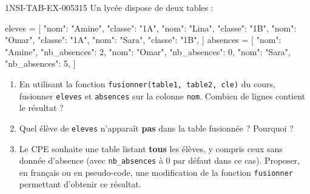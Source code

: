 \begin{exercice}{1NSI-TAB-EX-005}{3}{15}
Un lycée dispose de deux tables :
\begin{python}
eleves = [
    {"nom": "Amine", "classe": "1A"},
    {"nom": "Lina", "classe": "1B"},
    {"nom": "Omar", "classe": "1A"},
    {"nom": "Sara", "classe": "1B"},
]
absences = [
    {"nom": "Amine", "nb_absences": 2},
    {"nom": "Omar", "nb_absences": 0},
    {"nom": "Sara", "nb_absences": 5},
]
\end{python}
\begin{enumerate}
  \item En utilisant la fonction \lstinline{fusionner(table1, table2, cle)} du cours, fusionner \lstinline{eleves} et \lstinline{absences} sur la colonne \lstinline{nom}. Combien de lignes contient le résultat ?
  \item Quel élève de \lstinline{eleves} n'apparaît \textbf{pas} dans la table fusionnée ? Pourquoi ?
  \item Le CPE souhaite une table listant \textbf{tous} les élèves, y compris ceux sans donnée d'absence (avec \lstinline{nb_absences} à $0$ par défaut dans ce cas). Proposer, en français ou en pseudo-code, une modification de la fonction \lstinline{fusionner} permettant d'obtenir ce résultat.
\end{enumerate}
\end{exercice}
